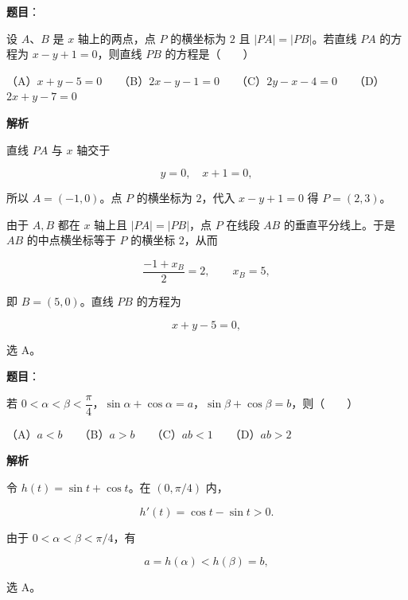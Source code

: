 \begin{answer}

\textbf{题目}：

设 $A$、$B$ 是 $x$ 轴上的两点，点 $P$ 的横坐标为 $2$ 且 $|PA|=|PB|$。若直线 $PA$ 的方程为 $x-y+1=0$，则直线 $PB$ 的方程是\mbox{（　　）}

（A）$x+y-5=0$　　（B）$2x-y-1=0$　　（C）$2y-x-4=0$　　（D）$2x+y-7=0$

\textbf{解析}

直线 $PA$ 与 $x$ 轴交于

\nopagebreak[4]
\[
y=0,\quad x+1=0,
\]

所以 $A=(-1,0)$。点 $P$ 的横坐标为 $2$，代入 $x-y+1=0$ 得 $P=(2,3)$。

由于 $A,B$ 都在 $x$ 轴上且 $|PA|=|PB|$，点 $P$ 在线段 $AB$ 的垂直平分线上。于是 $AB$ 的中点横坐标等于 $P$ 的横坐标 $2$，从而

\nopagebreak[4]
\[
\frac{-1+x_B}{2}=2,\qquad x_B=5,
\]

即 $B=(5,0)$。直线 $PB$ 的方程为

\nopagebreak[4]
\[
x+y-5=0,
\]

选 A。


\end{answer}
\begin{answer}

\textbf{题目}：

若 $0<\alpha<\beta<\dfrac\pi4$，$\sin\alpha+\cos\alpha=a$，$\sin\beta+\cos\beta=b$，则\mbox{（　　）}

（A）$a<b$　　（B）$a>b$　　（C）$ab<1$　　（D）$ab>2$

\textbf{解析}

令 $h(t)=\sin t+\cos t$。在 $(0,\pi/4)$ 内，

\nopagebreak[4]
\[
h'(t)=\cos t-\sin t>0.
\]

由于 $0<\alpha<\beta<\pi/4$，有

\nopagebreak[4]
\[
a=h(\alpha)<h(\beta)=b,
\]

选 A。


\end{answer}
